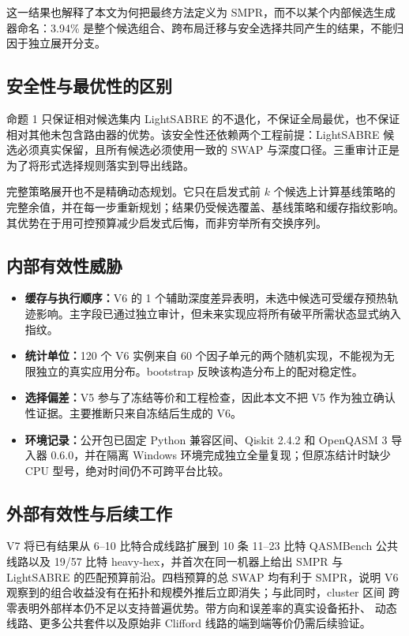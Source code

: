 \documentclass[11pt,a4paper]{article}
\begin{document}
这一结果也解释了本文为何把最终方法定义为 SMPR，而不以某个内部候选生成器命名：3.94\% 是整个候选组合、跨布局迁移与安全选择共同产生的结果，不能归因于独立展开分支。

\subsection{安全性与最优性的区别}

命题 1 只保证相对候选集内 LightSABRE 的不退化，不保证全局最优，也不保证相对其他未包含路由器的优势。该安全性还依赖两个工程前提：LightSABRE 候选必须真实保留，且所有候选必须使用一致的 SWAP 与深度口径。三重审计正是为了将形式选择规则落实到导出线路。

完整策略展开也不是精确动态规划。它只在启发式前 $k$ 个候选上计算基线策略的完整余值，并在每一步重新规划；结果仍受候选覆盖、基线策略和缓存指纹影响。其优势在于用可控预算减少启发式后悔，而非穷举所有交换序列。

\subsection{内部有效性威胁}

\begin{itemize}[itemsep=0.30em]
  \item \textbf{缓存与执行顺序：}V6 的 1 个辅助深度差异表明，未选中候选可受缓存预热轨迹影响。主字段已通过独立审计，但未来实现应将所有破平所需状态显式纳入指纹。
  \item \textbf{统计单位：}120 个 V6 实例来自 60 个因子单元的两个随机实现，不能视为无限独立的真实应用分布。bootstrap 反映该构造分布上的配对稳定性。
  \item \textbf{选择偏差：}V5 参与了冻结等价和工程检查，因此本文不把 V5 作为独立确认性证据。主要推断只来自冻结后生成的 V6。
  \item \textbf{环境记录：}公开包已固定 Python 兼容区间、Qiskit 2.4.2 和 OpenQASM 3 导入器 0.6.0，并在隔离 Windows 环境完成独立全量复现；但原冻结计时缺少 CPU 型号，绝对时间仍不可跨平台比较。
\end{itemize}

\subsection{外部有效性与后续工作}

V7 将已有结果从 6--10 比特合成线路扩展到 10 条 11--23 比特 QASMBench
公共线路以及 19/57 比特 heavy-hex，并首次在同一机器上给出 SMPR 与
LightSABRE 的匹配预算前沿。四档预算的总 SWAP 均有利于 SMPR，说明 V6
观察到的组合收益没有在拓扑和规模外推后立即消失；与此同时，cluster 区间
跨零表明外部样本仍不足以支持普遍优势。带方向和误差率的真实设备拓扑、
动态线路、更多公共套件以及原始非 Clifford 线路的端到端等价仍需后续验证。
\end{document}
